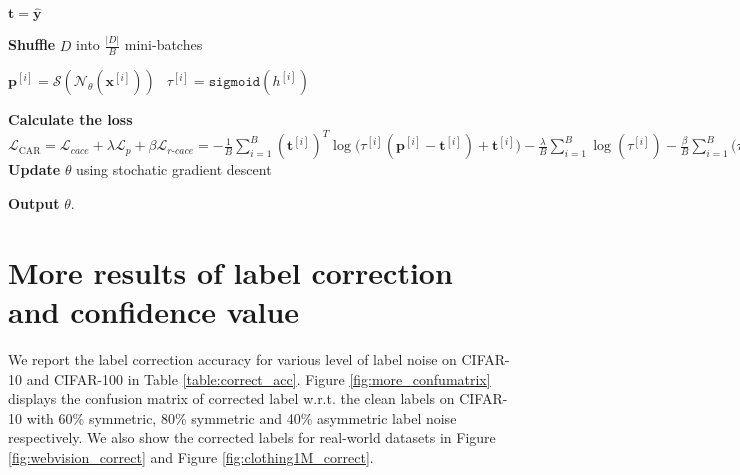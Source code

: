 \documentclass{article}
\begin{document}
\begin{algorithm} [htb!]
	\nonumber
	\small
	\caption{Confidence adaptive regularization (CAR)}
	\label{alg:1}
	$\bm{t}=\bm{\hat{y}}$ \qquad \qquad\qquad\qquad\qquad\qquad\qquad\qquad\quad\quad \qquad\quad{}\;
	{
		\textbf{Shuffle} $D$ into $\frac{|D|}{B}$ mini-batches \;
		{
			{
				$\bm{p}^{[i]}=\mathcal{S}(\mathcal{N}_{\theta}(\bm{x}^{[i]}))\ \ $ \qquad\qquad\qquad\quad {}\;
				$\tau^{[i]} = \mathtt{sigmoid}(h^{[i]})$ \qquad\qquad\qquad\qquad\qquad {}\;
				
			}
			\textbf{Calculate the loss} $\mathcal{L}_\text{CAR}= \mathcal{L}_{cace} + \lambda \mathcal{L}_{p} + \beta \mathcal{L}_{r\textrm{-}cace}= -\frac{1}{B}\sum_{i=1}^{B}(\bm{t}^{[i]})^{T}\log\big(\tau^{[i]}   
			(\bm{p}^{[i]}-\bm{t}^{[i]})+\bm{t}^{[i]}\big) -\frac{\lambda}{B}\sum_{i=1}^{B}\log(\tau^{[i]}) -\frac{\beta}{B}\sum_{i=1}^{B}\big(\tau^{[i]}(\bm{p}^{[i]}-\bm{t}^{[i]})+\bm{t}^{[i]}\big)^{T}\log(\bm{t}^{[i]})$ \;
			\textbf{Update} $\theta$ using stochatic gradient descent \; 
			
		}
	}
	\textbf{Output} $\theta$.
\end{algorithm}


\section{More results of label correction and confidence value}
\label{sec:more_label_correct}	
We report the label correction accuracy for various level of label noise on CIFAR-10 and CIFAR-100 in Table \ref{table:correct_acc}. Figure \ref{fig:more_confumatrix} displays the confusion matrix of corrected label w.r.t. the clean labels on CIFAR-10 with 60\% symmetric, 80\% symmetric and 40\% asymmetric label noise respectively. We also show the corrected labels for real-world datasets in Figure \ref{fig:webvision_correct} and Figure \ref{fig:clothing1M_correct}.
\end{document}
